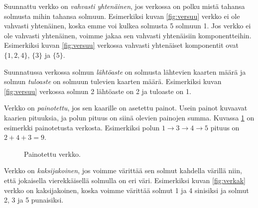 Suunnattu verkko on \emph{vahvasti yhtenäinen},
jos verkossa on polku mistä tahansa solmusta
mihin tahansa solmuun.
Esimerkiksi kuvan \ref{fig:versuu} verkko ei
ole vahvasti yhtenäinen,
koska emme voi kulkea solmusta 5 solmuun 1.
Jos verkko ei ole vahvasti yhtenäinen,
voimme jakaa sen vahvasti yhtenäisiin komponentteihin.
Esimerkiksi kuvan \ref{fig:versuu} verkossa
vahvasti yhtenäiset komponentit ovat $\{1,2,4\}$, $\{3\}$ ja $\{5\}$.

Suunnatussa verkossa solmun \emph{lähtöaste} on
solmusta lähtevien kaarten määrä ja solmun \emph{tuloaste}
on solmuun tulevien kaarten määrä.
Esimerkiksi kuvan \ref{fig:versuu} verkossa
solmun 2 lähtöaste on 2 ja tuloaste on 1.

Verkko on \emph{painotettu}, jos sen kaarille on asetettu painot.
Usein painot kuvaavat kaarien pituuksia, ja polun pituus
on siinä olevien painojen summa.
Kuvassa \ref{fig:verpai} on esimerkki painotetusta verkosta.
Esimerkiksi polun $1 \rightarrow 3 \rightarrow 4 \rightarrow 5$
pituus on $2+4+3=9$.

\begin{figure}
\center
\begin{center}
\end{center}
\caption{Painotettu verkko.}
\label{fig:verpai}
\end{figure}

Verkko on \emph{kaksijakoinen}, jos voimme värittää sen
solmut kahdella värillä niin, että jokaisella
vierekkäisellä solmulla on eri väri.
Esimerkiksi kuvan \ref{fig:verkak} verkko on kaksijakoinen,
koska voimme värittää solmut 1 ja 4 sinisiksi ja
solmut 2, 3 ja 5 punaisiksi.

